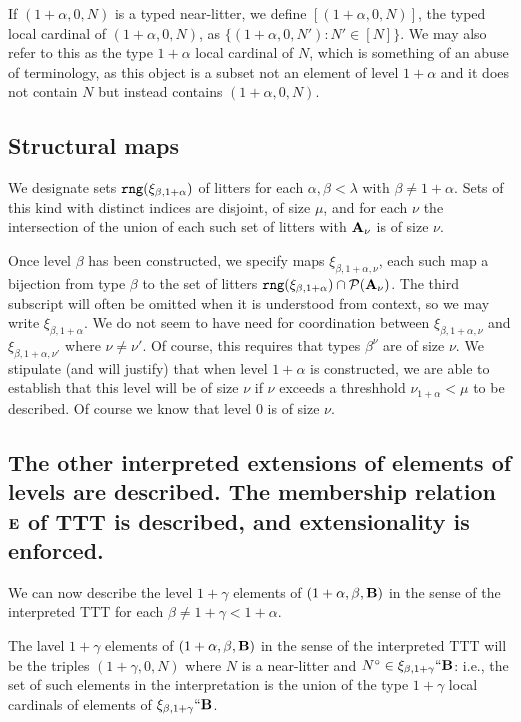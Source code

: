 \documentclass[12pt]{article}
\begin{document}
If $(1+\alpha,0,N)$ is a typed near-litter, we define $[(1+\alpha,0,N)]$, the typed local cardinal of $(1+\alpha,0,N)$, as $\{(1+\alpha,0,N'):N' \in [N]\}$.  We may also refer to this as the type $1+\alpha$ local cardinal of $N$, which is something of an abuse of terminology, as this object is a subset not an element of level $1+\alpha$ and it does not contain $N$
but instead contains $(1+\alpha,0,N)$.

\subsection{Structural maps}

We designate sets ${\tt rng}(\xi_{\beta,1+\alpha})$ of litters for each $\alpha, \beta <\lambda$ with $\beta \neq 1+\alpha$.  Sets of this kind with distinct indices are disjoint, of size $\mu$,
and for each $\nu$ the intersection of the union of each such set of litters with ${\bf A}_\nu$ is of size $\nu$.

Once level $\beta$ has been constructed, we specify  maps $\xi_{\beta,1+\alpha,\nu}$, each such map a bijection from type $\beta$ to the set of litters 
${\tt rng}(\xi_{\beta,1+\alpha})\cap {\cal P}({\bf A}_\nu)$.   The third subscript will often be omitted when it is understood from context, so we may write $\xi_{\beta,1+\alpha}$.  We do not seem to have need for coordination between $\xi_{\beta,1+\alpha,\nu}$ and $\xi_{\beta,1+\alpha,\nu'}$ where $\nu \neq \nu'$.  Of course, this requires that types $\beta^\nu$ are of size $\nu$.  We stipulate (and will justify) that when
level $1+\alpha$ is constructed, we are able to establish that this level will be of size $\nu$ if $\nu$ exceeds a threshhold $\nu_{1+\alpha}<\mu$ to be described.  Of course we know that level 0 is of size $\nu$.

\subsection{The other interpreted extensions of elements of levels are described.  The membership relation ${\bf E}$ of TTT is described, and extensionality is enforced.}

We can now describe the level $1+\gamma$ elements of $(1+\alpha,\beta,{\bf B})$ in the sense of the interpreted TTT for each $\beta \neq 1+\gamma <1+\alpha$.

The lavel $1+\gamma$ elements of $(1+\alpha,\beta,{\bf B})$ in the sense of the interpreted TTT will be the triples $(1+\gamma,0,N)$ where $N$ is a near-litter and $N^\circ \in \xi_{\beta,1+\gamma}``{\bf B}$:  i.e., the set of such elements in the interpretation is the union of the type $1+\gamma$ local cardinals of elements of $\xi_{\beta,1+\gamma}``{\bf B}$.
\end{document}
